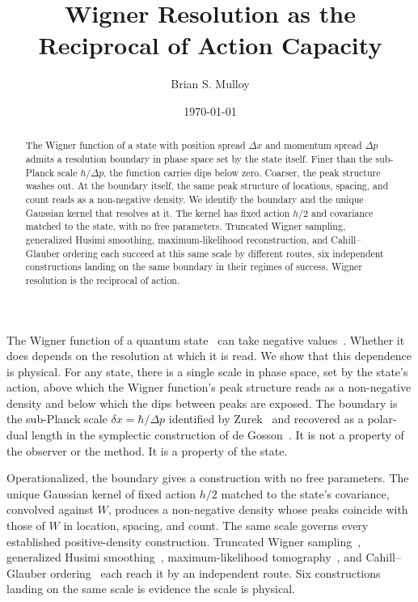 \documentclass[%
  aps, reprint, pra, amsmath,amssymb
]{revtex4-2}
\begin{document}
\title{Wigner Resolution as the Reciprocal of Action Capacity}

\begin{abstract}
The Wigner function of a state with position spread $\Delta x$ and momentum spread $\Delta p$ admits a resolution boundary in phase space set by the state itself. Finer than the sub-Planck scale $\hbar/\Delta p$, the function carries dips below zero. Coarser, the peak structure washes out. At the boundary itself, the same peak structure of locations, spacing, and count reads as a non-negative density. We identify the boundary and the unique Gaussian kernel that resolves at it. The kernel has fixed action $h/2$ and covariance matched to the state, with no free parameters. Truncated Wigner sampling, generalized Husimi smoothing, maximum-likelihood reconstruction, and Cahill--Glauber ordering each succeed at this same scale by different routes, six independent constructions landing on the same boundary in their regimes of success. Wigner resolution is the reciprocal of action.
\end{abstract}

\author{Brian S. Mulloy}

\date{\today}

\maketitle


The Wigner function of a quantum state~\cite{wigner1932} can take negative values~\cite{hudson1974}. Whether it does depends on the resolution at which it is read. We show that this dependence is physical. For any state, there is a single scale in phase space, set by the state's action, above which the Wigner function's peak structure reads as a non-negative density and below which the dips between peaks are exposed. The boundary is the sub-Planck scale $\delta x = \hbar/\Delta p$ identified by Zurek~\cite{zurek2001} and recovered as a polar-dual length in the symplectic construction of de Gosson~\cite{degosson2013qblobs}. It is not a property of the observer or the method. It is a property of the state.

Operationalized, the boundary gives a construction with no free parameters. The unique Gaussian kernel of fixed action $h/2$ matched to the state's covariance, convolved against $W$, produces a non-negative density whose peaks coincide with those of $W$ in location, spacing, and count. The same scale governs every established positive-density construction. Truncated Wigner sampling~\cite{polkovnikov2010}, generalized Husimi smoothing~\cite{husimi1940,wodkiewicz1984}, maximum-likelihood tomography~\cite{lvovsky2009}, and Cahill--Glauber ordering~\cite{cahillglauber1969} each reach it by an independent route. Six constructions landing on the same scale is evidence the scale is physical.
\end{document}
